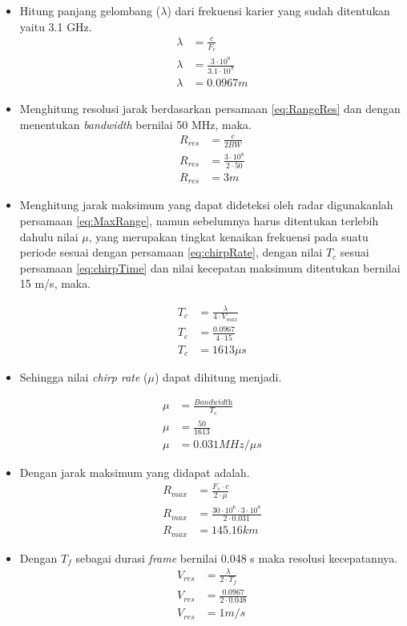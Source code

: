 \begin{itemize}
	\item Hitung panjang gelombang ($\lambda$) dari frekuensi karier yang sudah ditentukan yaitu 3.1 GHz.
	\begin{align*}
		\lambda &= \frac{c}{F_{c}}\\
		\lambda &= \frac{3 \cdot 10^{8}}{3.1 \cdot 10^{9}}\\
		\lambda &= 0.0967 m
	\end{align*}

	\item Menghitung resolusi jarak berdasarkan persamaan \ref{eq:RangeRes} dan dengan menentukan \textit{bandwidth} bernilai 50 MHz, maka.
		\begin{align*}
			R_{res} &= \frac{c}{2 BW} \\
			R_{res} &= \frac{3 \cdot 10^{8}}{2 \cdot 50}\\
			R_{res} &= 3 m
		\end{align*}
	\item Menghitung jarak maksimum yang dapat dideteksi oleh radar digunakanlah persamaan \ref{eq:MaxRange}, namun sebelumnya harus ditentukan terlebih dahulu nilai $\mu$, yang merupakan tingkat kenaikan frekuensi pada suatu periode sesuai dengan persamaan \ref{eq:chirpRate}, dengan nilai $T_{c}$ sesuai persamaan \ref{eq:chirpTime} dan nilai kecepatan maksimum ditentukan bernilai 15 m/s, maka.
	
	\begin{align*}
		T_{c} &= \frac{\lambda}{4 \cdot V_{max}}\\
		T_{c} &= \frac{0.0967}{4 \cdot 15}\\
		T_{c} &= 1613 \mu s
	\end{align*}

	\item 
	Sehingga nilai \textit{chirp rate} ($\mu$) dapat dihitung menjadi.

		\begin{align*}
		\mu &= \frac{\textit{Bandwidth}}{T_{c}}\\
		\mu &= \frac{\textit{50}}{1613}\\
		\mu &= 0.031 MHz/ \mu s
		\end{align*}

	\item 	
	Dengan jarak maksimum yang didapat adalah.
		\begin{align*}
		R_{max} &= \frac{F_{s} \cdot c}{2 \cdot \mu}\\
		R_{max} &= \frac{30 \cdot 10^{6} \cdot 3 \cdot 10^{8}}{2 \cdot 0.031}\\
		R_{max} &= 145.16 km
		\end{align*}

	\item 
	Dengan $T_{f}$ sebagai durasi \textit{frame} bernilai 0.048 s maka resolusi kecepatannya.
		\begin{align*}
			V_{res} &= \frac{\lambda}{2 \cdot T_{f}}\\
			V_{res} &= \frac{0.0967}{2 \cdot 0.048}\\
			V_{res} &= 1 m/s
		\end{align*}

\end{itemize}

